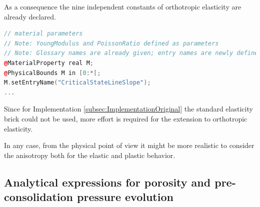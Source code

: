 \documentclass[paper=a4, twoside, pagesize]{scrartcl}
\begin{document}
As a consequence the nine independent constants of orthotropic elasticity are already declared.

\begin{lstlisting}[language={C++}]
// material parameters
// Note: YoungModulus and PoissonRatio defined as parameters
// Note: Glossary names are already given; entry names are newly defined
@MaterialProperty real M;
@PhysicalBounds M in [0:*[;
M.setEntryName("CriticalStateLineSlope");
...
\end{lstlisting}

Since for Implementation \ref{subsec:ImplementationOriginal} the standard elasticity brick could not be used, more effort is required for the extension to orthotropic elasticity.

In any case, from the physical point of view it might be more realistic to consider the anisotropy both for the elastic and plastic behavior.

\subsection{Analytical expressions for porosity and pre-consolidation pressure evolution}
\label{subsec:AppSolutionPorosity}
\end{document}
